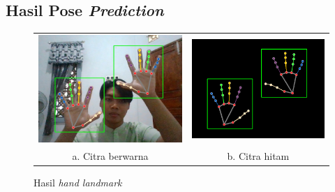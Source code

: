 \subsection{Hasil Pose \emph{Prediction}}

\begin{figure}[H]
  \centering
  \begin{tabular}{cc}
    \includegraphics[width=0.4\linewidth]{../Gambar/hasilposepred.jpg} & \includegraphics[width=0.4\linewidth]{../Gambar/hasilposepredhitam.png} \\
    a. Citra berwarna & b. Citra hitam 
    \end{tabular}
    \caption{Hasil\emph{ hand landmark}}
  \label{fig:hasilposepred}
\end{figure}

